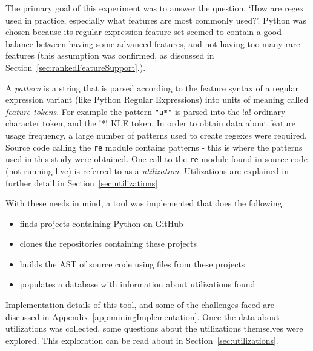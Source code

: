 \label{sec:featureOverview}
The primary goal of this experiment was to answer the question, `How are regex used in practice, especially what features are most commonly used?'.  Python was chosen because its regular expression feature set seemed to contain a good balance between having some advanced features, and not having too many rare features (this assumption was confirmed, as discussed in Section~\ref{sec:rankedFeatureSupport}.).

A \emph{pattern} is a string that is parsed according to the feature syntax of a regular expression variant (like Python Regular Expressions) into units of meaning called \emph{feature tokens}.  For example the pattern \verb!"a*"! is parsed into the \bverb!a! ordinary character token, and the \bverb!*! KLE token.  In order to obtain data about feature usage frequency, a large number of patterns used to create regexes were required.  Source code calling the {\tt re} module contains patterns - this is where the patterns used in this study were obtained. One call to the {\tt re} module found in source code (not running live) is referred to as a \emph{utilization}.  Utilizations are explained in further detail in Section~\ref{sec:utilizations}

With these needs in mind, a tool was implemented that does the following:
\begin{itemize} \itemsep -1pt
\item finds projects containing Python on GitHub
\item clones the repositories containing these projects
\item builds the AST of source code using files from these projects
\item populates a database with information about utilizations found
\end{itemize}

Implementation details of this tool, and some of the challenges faced are discussed in Appendix~\ref{app:miningImplementation}.  Once the data about utilizations was collected, some questions about the utilizations themselves were explored.  This exploration can be read about in Section~\ref{sec:utilizations}.


